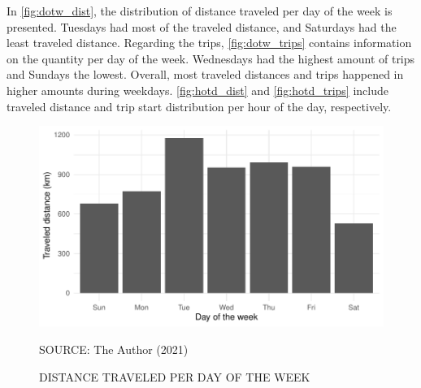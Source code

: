 


In \autoref{fig:dotw_dist}, the distribution of distance traveled per day of the week is presented. Tuesdays had most of the traveled distance, and Saturdays had the least traveled distance. Regarding the trips, \autoref{fig:dotw_trips} contains information on the quantity per day of the week. Wednesdays had the highest amount of trips and Sundays the lowest. Overall, most traveled distances and trips happened in higher amounts during weekdays. \autoref{fig:hotd_dist} and \autoref{fig:hotd_trips} include traveled distance and trip start distribution per hour of the day, respectively.  

\begin{figure}[!htbp]
    \centering\footnotesize
    \captionsetup{font=footnotesize}
    \caption{DISTANCE TRAVELED PER DAY OF THE WEEK}
    \includegraphics{fig/dotw_dist.pdf}
    \label{fig:dotw_dist}
    \par SOURCE: The Author (2021)
\end{figure}

